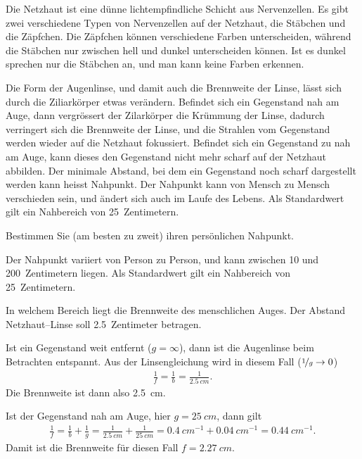 \documentclass[12pt,a4paper,twoside]{article}
\begin{document}
Die Netzhaut ist eine dünne lichtempfindliche Schicht aus Nervenzellen. Es gibt zwei verschiedene Typen von Nervenzellen auf der Netzhaut,
die Stäbchen und die Zäpfchen. Die Zäpfchen können verschiedene Farben unterscheiden, während die Stäbchen nur zwischen hell und dunkel unterscheiden können.
Ist es dunkel sprechen nur die Stäbchen an, und man kann keine Farben erkennen.

Die Form der Augenlinse, und damit auch die Brennweite der Linse, lässt sich durch die Ziliarkörper etwas verändern.
Befindet sich ein Gegenstand nah am Auge, dann vergrössert der Zilarkörper die Krümmung der Linse, dadurch verringert sich die Brennweite der Linse, und
die Strahlen vom Gegenstand werden wieder auf die Netzhaut fokussiert.
Befindet sich ein Gegenstand zu nah am Auge, kann dieses den Gegenstand nicht mehr scharf auf der Netzhaut abbilden.
Der minimale Abstand, bei dem ein Gegenstand noch scharf dargestellt werden kann heisst Nahpunkt.
Der Nahpunkt kann von Mensch zu Mensch verschieden sein, und ändert sich auch im Laufe des Lebens.
Als Standardwert gilt ein Nahbereich von \SI{25}{Zentimetern}.

\begin{aufgabe}
	Bestimmen Sie (am besten zu zweit) ihren persönlichen Nahpunkt.
	\begin{loesung}
		Der Nahpunkt variiert von Person zu Person, und kann zwischen 10 und \SI{200}{Zentimetern} liegen.
Als Standardwert gilt ein Nahbereich von \SI{25}{Zentimetern}.
	\end{loesung}
\end{aufgabe}
\begin{aufgabe}
	In welchem Bereich liegt die Brennweite des menschlichen Auges. Der Abstand Netzhaut--Linse soll \SI{2.5}{Zentimeter} betragen.
	\begin{loesung}
		Ist ein Gegenstand weit entfernt ($g=\infty$), dann ist die Augenlinse beim Betrachten entspannt.
		Aus der Linsengleichung wird in diesem Fall ($\nicefrac{1}{g}\to 0$)
		\begin{eqnarray*}
			\frac{1}{f}=\frac{1}{b}=\frac{1}{\SI{2.5}{cm}}\text{.}
		\end{eqnarray*}
		Die Brennweite ist dann also \SI{2.5}{cm}.

		Ist der Gegenstand nah am Auge, hier $g=\SI{25}{cm}$, dann gilt
		\begin{eqnarray*}
			\frac{1}{f}=\frac{1}{b} + \frac{1}{g} =\frac{1}{\SI{2.5}{cm}} + \frac{1}{\SI{25}{cm}}=\SI{0.4}{cm^{-1}} + \SI{0.04}{cm^{-1}}=\SI{0.44}{cm^{-1}}\text{.}
		\end{eqnarray*}
		Damit ist die Brennweite für diesen Fall $f=\SI{2.27}{cm}$.
	\end{loesung}
\end{aufgabe}
\end{document}
